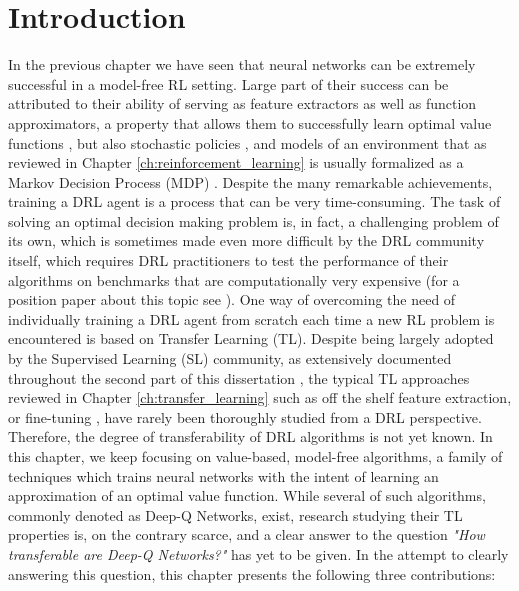 \section{Introduction}
\label{sec:intro}

In the previous chapter we have seen that neural networks can be extremely successful in a model-free RL setting. Large part of their success can be attributed to their ability of serving as feature extractors as well as function approximators, a property that allows them to successfully learn optimal value functions \citep{mnih2013playing,mnih2015human,van2016deep,zhao2016deep,wang2016dueling,sabatelli2020deep}, but also stochastic policies \citep{lillicrap2015continuous,schulman2015high,schulman2015trust,wang2016sample,mnih2016asynchronous,schulman2017proximal,haarnoja2018soft,fujimoto2018addressing}, and models of an environment \citep{ha2018world,kaiser2019model,hafner2019dream,hafner2019learning,hafner2020mastering} that as reviewed in Chapter \ref{ch:reinforcement_learning} is usually formalized as a Markov Decision Process (MDP) %
\cite{puterman1990markov}. Despite the many remarkable achievements, training a DRL agent is a process that can be very time-consuming. The task of solving an optimal decision making problem is,  in fact, a challenging problem of its own, which is sometimes made even more difficult by the DRL community itself, which requires DRL practitioners to test the performance of their algorithms on benchmarks that are computationally very expensive (for a position paper about this topic see \citep{obando2020revisiting}). One way of overcoming the need of individually training a DRL agent from scratch each time a new RL problem is encountered is based on Transfer Learning (TL). 
Despite being largely adopted by the Supervised Learning (SL) community, as extensively documented throughout the second part of this dissertation \citep{huh2016makes,mormont2018comparison,sabatelli2018deep,dominguez2019transfer,vandaele2021deep,ho2021evaluation}, the typical TL approaches reviewed in Chapter \ref{ch:transfer_learning} such as off the shelf feature extraction, or fine-tuning \citep{sharif2014cnn}, have rarely been thoroughly studied from a DRL perspective. Therefore, the degree of transferability of DRL algorithms is not yet known. In this chapter, we keep focusing on value-based, model-free algorithms, a family of techniques which trains neural networks with the intent of learning an approximation of an optimal value function. While several of such algorithms, commonly denoted as Deep-Q Networks, exist, research studying their TL properties is, on the contrary scarce, and a clear answer to the question \textit{"How transferable are Deep-Q Networks?"} has yet to be given. In the attempt to clearly answering this question, this chapter presents the following three contributions:
